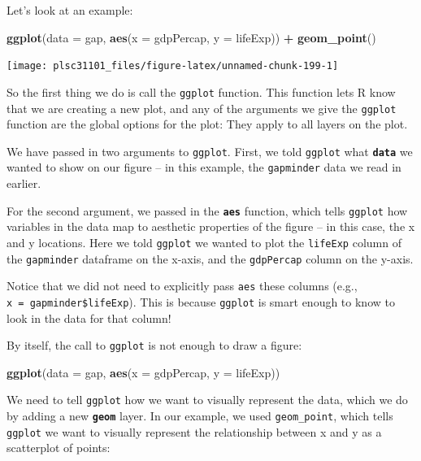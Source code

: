\documentclass[]{book}
\newenvironment{Shaded}{\begin{snugshade}}{\end{snugshade}}
\newcommand{\KeywordTok}[1]{\textcolor[rgb]{0.13,0.29,0.53}{\textbf{#1}}}
\newcommand{\DataTypeTok}[1]{\textcolor[rgb]{0.13,0.29,0.53}{#1}}
\newcommand{\StringTok}[1]{\textcolor[rgb]{0.31,0.60,0.02}{#1}}
\newcommand{\OperatorTok}[1]{\textcolor[rgb]{0.81,0.36,0.00}{\textbf{#1}}}
\newcommand{\NormalTok}[1]{#1}
\begin{document}
Let's look at an example:

\begin{Shaded}
\begin{Highlighting}[]
\KeywordTok{ggplot}\NormalTok{(}\DataTypeTok{data =}\NormalTok{ gap, }\KeywordTok{aes}\NormalTok{(}\DataTypeTok{x =}\NormalTok{ gdpPercap, }\DataTypeTok{y =}\NormalTok{ lifeExp)) }\OperatorTok{+}
\StringTok{  }\KeywordTok{geom_point}\NormalTok{()}
\end{Highlighting}
\end{Shaded}

\begin{center}\texttt{[image: plsc31101\_files/figure-latex/unnamed-chunk-199-1]} \end{center}

So the first thing we do is call the \texttt{ggplot} function. This
function lets R know that we are creating a new plot, and any of the
arguments we give the \texttt{ggplot} function are the global options
for the plot: They apply to all layers on the plot.

We have passed in two arguments to \texttt{ggplot}. First, we told
\texttt{ggplot} what \textbf{\texttt{data}} we wanted to show on our
figure -- in this example, the \texttt{gapminder} data we read in
earlier.

For the second argument, we passed in the \textbf{\texttt{aes}}
function, which tells \texttt{ggplot} how variables in the data map to
aesthetic properties of the figure -- in this case, the x and y
locations. Here we told \texttt{ggplot} we wanted to plot the
\texttt{lifeExp} column of the \texttt{gapminder} dataframe on the
x-axis, and the \texttt{gdpPercap} column on the y-axis.

Notice that we did not need to explicitly pass \texttt{aes} these
columns (e.g., \texttt{x\ =\ gapminder\$lifeExp}). This is because
\texttt{ggplot} is smart enough to know to look in the data for that
column!

By itself, the call to \texttt{ggplot} is not enough to draw a figure:

\begin{Shaded}
\begin{Highlighting}[]
\KeywordTok{ggplot}\NormalTok{(}\DataTypeTok{data =}\NormalTok{ gap, }\KeywordTok{aes}\NormalTok{(}\DataTypeTok{x =}\NormalTok{ gdpPercap, }\DataTypeTok{y =}\NormalTok{ lifeExp))}
\end{Highlighting}
\end{Shaded}

We need to tell \texttt{ggplot} how we want to visually represent the
data, which we do by adding a new \textbf{\texttt{geom}} layer. In our
example, we used \texttt{geom\_point}, which tells \texttt{ggplot} we
want to visually represent the relationship between x and y as a
scatterplot of points:
\end{document}
